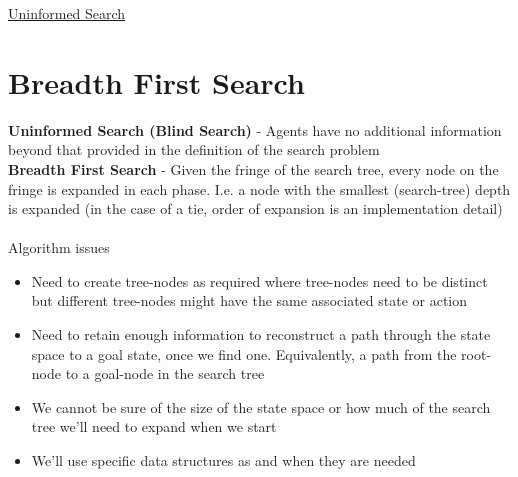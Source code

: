 \documentclass{article}[18pt]
\begin{document}
\begin{center}
\underline{\huge Uninformed Search}
\end{center}
\section{Breadth First Search}
\textbf{Uninformed Search (Blind Search)} - Agents have no additional information beyond that provided in the definition of the search problem\\
\textbf{Breadth First Search} - Given the fringe of the search tree, every node on the fringe is expanded in each phase. I.e. a node with the smallest (search-tree) depth is expanded (in the case of a tie, order of expansion is an implementation detail)\\
\\
Algorithm issues
\begin{itemize}
	\item Need to create tree-nodes as required where tree-nodes need to be distinct but different tree-nodes might have the same associated state or action
	\item Need to retain enough information to reconstruct a path through the state space to a goal state, once we find one. Equivalently, a path from the root-node to a goal-node in the search tree
	\item We cannot be sure of the size of the state space or how much of the search tree we'll need to expand when we start
	\item We'll use specific data structures as and when they are needed
\end{itemize}
\end{document}
